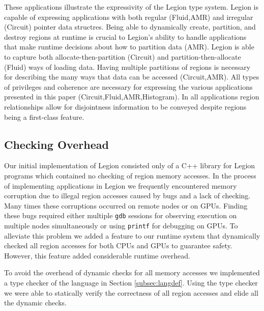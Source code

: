 These applications illustrate the expressivity of the Legion type system.  Legion is capable of 
expressing applications with both regular (Fluid,AMR) and irregular (Circuit) pointer data structres.
Being able to dynamically create, partition, and destroy regions at runtime is crucial to Legion's
ability to handle applications that make runtime decisions about how to partition data (AMR).  Legion
is able to capture both allocate-then-partition (Circuit) and partition-then-allocate (Fluid) ways 
of loading data.  Having multiple partitions of regions is necessary for describing the many ways 
that data can be accessed (Circuit,AMR).  All types of privileges and coherence are necessary for 
expressing the various applications presented in this paper (Circuit,Fluid,AMR,Histogram).  In
all applications region relationships allow for disjointness information to be conveyed despite
regions being a first-class feature.

\subsection{Checking Overhead}
\label{subsec:overhead}
Our initial implementation of Legion consisted only of a C++ library for Legion 
programs\cite{Legion12} which contained no checking of region memory accesses.  In the process
of implementing applications in Legion we frequently encountered memory corruption due to
illegal region accesses caused by bugs and a lack of checking.  Many times these corruptions 
occurred on remote nodes or on GPUs.  Finding these bugs required either multiple {\tt gdb} sessions 
for observing execution on multiple nodes simultaneously or using {\tt printf} for debugging on
GPUs.  To alleviate this problem we added a feature to our runtime system that dynamically checked all region 
accesses for both CPUs and GPUs to guarantee safety.  However, this feature
added considerable runtime overhead.  

To avoid the overhead of dynamic checks for all memory accesses we implemented a type checker of the
language in Section \ref{subsec:langdef}.  Using the type checker we were able to statically verify
the correctness of all region accesses and elide all the dynamic checks.  


